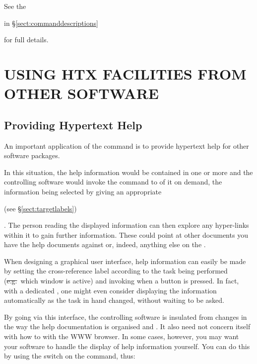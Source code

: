 See the 
\begin{latexonly}
in \S\ref{sect:commanddescriptions}
\end{latexonly}
for full details.

\section{USING HTX FACILITIES FROM OTHER SOFTWARE}

\subsection{\label{sect:hypertexthelp}Providing Hypertext Help}

An important application of the  command is to
provide hypertext help for other software packages.

In this situation, the help information would be contained in one or
more  and the
controlling software would invoke the  command to
 of it on
demand, the information being selected by giving an appropriate
\begin{latexonly}
(see \S\ref{sect:targetlabels})
\end{latexonly}. The person
reading the displayed information can then explore any hyper-links
within it to gain further information. These could point at other
documents you have  the help
documents against or, indeed, anything else on the .

When designing a graphical user interface, help information can easily
be made  by setting the cross-reference label
according to the task being performed (\st{e.g.}\ which window is
active) and invoking  when a  button is
pressed. In fact, with a dedicated , one might even consider displaying
the information automatically as the task in hand changed, without
waiting to be asked.

By going via this  interface, the controlling
software is insulated from changes in the way the help documentation
is organised and . It also need not
concern itself with how to
 with the WWW
browser. \label{text:gettingdocumenturls}In some cases, however, you
may want your software to handle the display of help information
yourself. You can do this by using the  switch on the
 command, thus:

